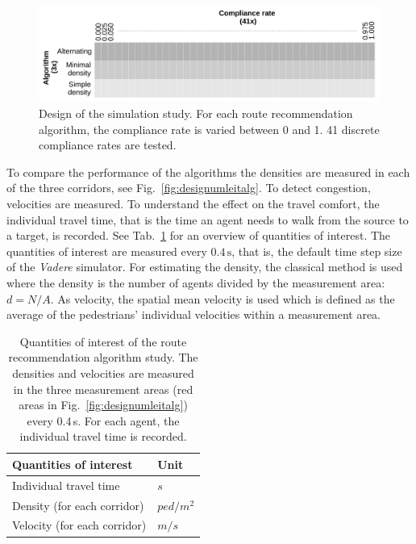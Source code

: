 \begin{figure}[hbt!]
\includegraphics[width=\textwidth]{../figures/investigation/VergleichUmleitalgorithmen/designSimStudy.pdf} 
\caption[Design of the algorithm selection study]{Design of the simulation study. For each route recommendation algorithm, the compliance rate is varied between 0 and 1. 41 discrete compliance rates are tested.}
\label{fig:doeS2}
\end{figure}



To compare the performance of the algorithms the densities are measured in each of the three corridors, see Fig.~\ref{fig:designumleitalg}. To detect congestion,  velocities are measured. To understand the effect on the travel comfort, the individual travel time, that is the time an agent needs to walk from the source to a target, is recorded. See Tab.~\ref{tab:doe} for an overview of quantities of interest.
The quantities of interest are measured every $0.4\,\text{s}$, that is, the default time step size of the \textit{Vadere} simulator. For estimating the density, the classical method is used where the density is the number of agents divided by the measurement area: $d = N/A$.
As velocity, the spatial mean velocity is used  which is defined as the average of the pedestrians’ individual velocities within a measurement area.
% 

 

%


%



\begin{table}[H]
\center
\begin{tabular}{ll}
\hline
Quantities of interest & Unit  \\  \hline
Individual travel time  & $s$ \\
Density (for each corridor) & $ped/m^2$ \\                                                                             Velocity (for each corridor) & $m/s$ \\ \hline
\end{tabular}
\caption[Quantities of interest of the algorithm selection study]{Quantities of interest of the route recommendation algorithm study. The densities and velocities are measured in the three measurement areas (red areas in Fig.~\ref{fig:designumleitalg}) every 0.4\,s. For each agent, the individual travel time is recorded. }
\label{tab:doe}
\end{table}

